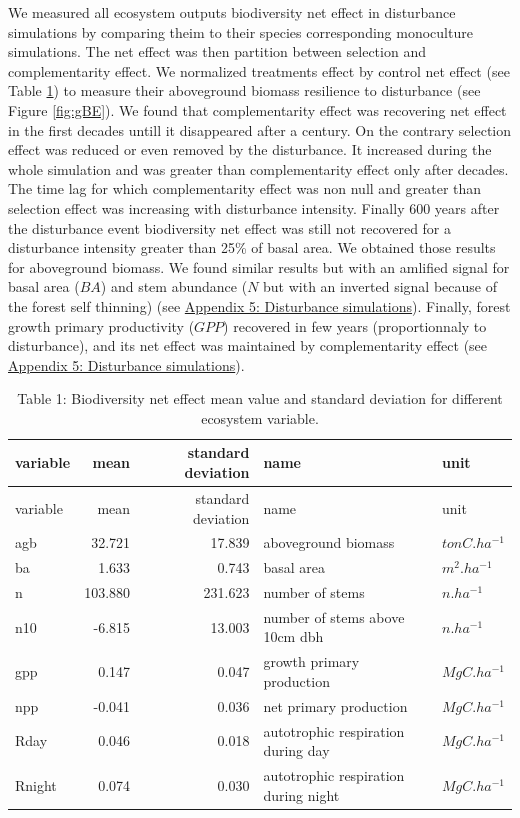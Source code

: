 \documentclass[12pt,]{article}
\theoremstyle{definition}
\theoremstyle{definition}
\theoremstyle{remark}
\begin{document}
We measured all ecosystem outputs biodiversity net effect in disturbance
simulations by comparing theim to their species corresponding
monoculture simulations. The net effect was then partition between
selection and complementarity effect. We normalized treatments effect by
control net effect (see Table \ref{tab:tNE}) to measure their
aboveground biomass resilience to disturbance (see Figure
\ref{fig:gBE}). We found that complementarity effect was recovering net
effect in the first decades untill it disappeared after a century. On
the contrary selection effect was reduced or even removed by the
disturbance. It increased during the whole simulation and was greater
than complementarity effect only after decades. The time lag for which
complementarity effect was non null and greater than selection effect
was increasing with disturbance intensity. Finally 600 years after the
disturbance event biodiversity net effect was still not recovered for a
disturbance intensity greater than 25\% of basal area. We obtained those
results for aboveground biomass. We found similar results but with an
amlified signal for basal area (\(BA\)) and stem abundance (\(N\) but
with an inverted signal because of the forest self thinning) (see
\protect\hyperlink{appendix-5-disturbance-simulations}{Appendix 5:
Disturbance simulations}). Finally, forest growth primary productivity
(\(GPP\)) recovered in few years (proportionnaly to disturbance), and
its net effect was maintained by complementarity effect (see
\protect\hyperlink{appendix-5-disturbance-simulations}{Appendix 5:
Disturbance simulations}).

\begin{longtable}[]{@{}lrrll@{}}
\caption{\label{tab:tNE}Table 1: Biodiversity net effect mean value and
standard deviation for different ecosystem variable.}\tabularnewline
\toprule
variable & mean & standard deviation & name & unit\tabularnewline
\midrule
\endfirsthead
\toprule
variable & mean & standard deviation & name & unit\tabularnewline
\midrule
\endhead
agb & 32.721 & 17.839 & aboveground biomass &
\(tonC.ha^{-1}\)\tabularnewline
ba & 1.633 & 0.743 & basal area & \(m^2.ha^{-1}\)\tabularnewline
n & 103.880 & 231.623 & number of stems & \(n.ha^{-1}\)\tabularnewline
n10 & -6.815 & 13.003 & number of stems above 10cm dbh &
\(n.ha^{-1}\)\tabularnewline
gpp & 0.147 & 0.047 & growth primary production &
\(MgC.ha^{-1}\)\tabularnewline
npp & -0.041 & 0.036 & net primary production &
\(MgC.ha^{-1}\)\tabularnewline
Rday & 0.046 & 0.018 & autotrophic respiration during day &
\(MgC.ha^{-1}\)\tabularnewline
Rnight & 0.074 & 0.030 & autotrophic respiration during night &
\(MgC.ha^{-1}\)\tabularnewline
\bottomrule
\end{longtable}
\end{document}
